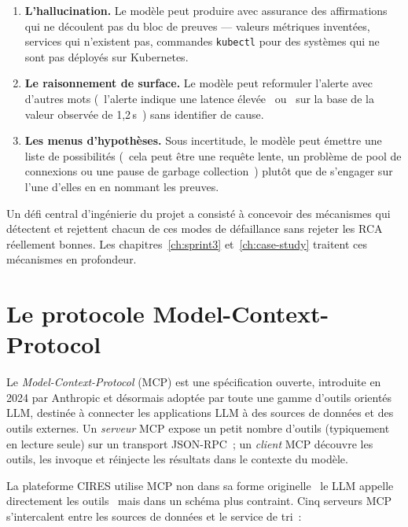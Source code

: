 \documentclass[11pt,a4paper,oneside]{report}
\begin{document}
\begin{enumerate}
  \item \textbf{L'hallucination.} Le modèle peut produire avec
        assurance des affirmations qui ne découlent pas du bloc de
        preuves --- valeurs métriques inventées, services qui
        n'existent pas, commandes \texttt{kubectl} pour des systèmes
        qui ne sont pas déployés sur Kubernetes.
  \item \textbf{Le raisonnement de surface.} Le modèle peut
        reformuler l'alerte avec d'autres mots
        (\og~l'alerte indique une latence élevée~\fg{} ou
        \og~sur la base de la valeur observée de 1,2\,s~\fg{}) sans
        identifier de cause.
  \item \textbf{Les menus d'hypothèses.} Sous incertitude, le
        modèle peut émettre une liste de possibilités
        (\og~cela peut être une requête lente, un problème de pool
        de connexions ou une pause de garbage collection~\fg{})
        plutôt que de s'engager sur l'une d'elles en en nommant les
        preuves.
\end{enumerate}

Un défi central d'ingénierie du projet a consisté à concevoir des
mécanismes qui détectent et rejettent chacun de ces modes de
défaillance sans rejeter les RCA réellement bonnes. Les
chapitres~\ref{ch:sprint3} et~\ref{ch:case-study} traitent ces
mécanismes en profondeur.

\section{Le protocole Model-Context-Protocol}

Le \emph{Model-Context-Protocol} (MCP) est une spécification ouverte,
introduite en 2024 par Anthropic et désormais adoptée par toute une
gamme d'outils orientés LLM, destinée à connecter les applications
LLM à des sources de données et des outils externes. Un \emph{serveur}
MCP expose un petit nombre d'outils (typiquement en lecture seule)
sur un transport JSON-RPC~; un \emph{client} MCP découvre les
outils, les invoque et réinjecte les résultats dans le contexte du
modèle.

La plateforme CIRES utilise MCP non dans sa forme originelle
\og~le LLM appelle directement les outils~\fg{} mais dans un schéma
plus contraint. Cinq serveurs MCP s'intercalent entre les sources de
données et le service de tri~:
\end{document}

